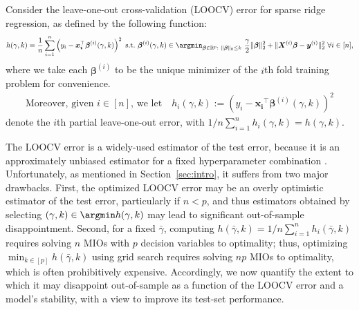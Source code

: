 \documentclass[opre,nonblindrev]{informs3} %
\let\footnote=\endnote
\begin{document}
Consider the leave-one-out cross-validation (LOOCV) error \citep[c.f.][]{stone1974cross, allen1974relationship} for sparse ridge regression, as defined by the following function:
\begin{equation*}
	h(\gamma,k) = \frac{1}{n}\sum_{i=1}^n \left(y_i -\bm{x_i}^\top \bm{\beta}^{(i)}(\gamma,k)\right)^2\
	\text{s.t.} \  \bm{\beta}^{(i)}(\gamma, k) \in \argmin_{\bm{\beta} \in \mathbb{R}^p: \ \Vert \bm{\beta}\Vert_0 \leq k} \ \frac{\gamma}{2}\Vert \bm{\beta}\Vert_2^2 +\Vert \bm{X}^{(i)}\bm{\beta}-\bm{y}^{(i)}\Vert_2^2\ \forall i \in [n],
\end{equation*}
where we take each $\bm{\beta}^{(i)}$ to be the unique minimizer of the $i$th fold training problem for convenience.%
\begin{equation}
\begin{aligned}
\label{eq:partialLOOE}
\text{Moreover, given $i\in [n]$, we let} \quad h_i(\gamma, k):=\left(y_i -\bm{x_i}^\top \bm{\beta}^{(i)}(\gamma,k)\right)^2
\end{aligned}
\end{equation}
denote the $i$th partial leave-one-out error, with $1/n \sum_{i=1}^n h_i(\gamma, k)=h(\gamma, k)$. 

The LOOCV error is a widely-used estimator of the test error, because it is an approximately unbiased estimator for a fixed hyperparameter combination \citep[c.f.][Chap 7.10]{hastie2009elements}. Unfortunately, as mentioned in Section~\ref{sec:intro}, it suffers from two major drawbacks. First, the optimized LOOCV error may be an overly optimistic estimator of the test error, particularly if $n<p$, and thus estimators obtained by selecting $(\gamma,k)\in \argmin h(\gamma,k)$ may lead to significant out-of-sample disappointment. Second, for a fixed $\bar \gamma$, computing $h(\bar \gamma, k)=1/n \sum_{i=1}^n h_i(\bar \gamma, k)$ requires solving $n$ MIOs with $p$ decision variables to optimality; thus, optimizing $\min_{k\in [p]}h(\bar \gamma,k)$ using grid search requires solving $np$ MIOs to optimality, which is often prohibitively expensive. Accordingly, we now quantify the extent to which it may disappoint out-of-sample as a function of the LOOCV error and a model's stability, with a view to improve its test-set performance. 
\end{document}
